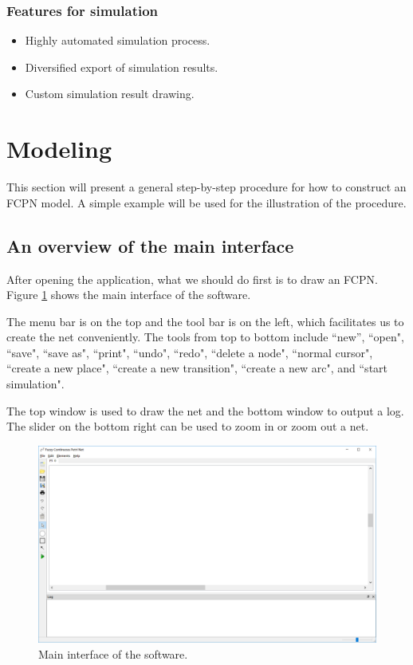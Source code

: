 \documentclass[journal,a4paper,onecolumn]{article}
\begin{document}
\subsubsection{Features for simulation}
\begin{itemize}
	\item Highly automated simulation process.
	\item Diversified export of simulation results.
	\item Custom simulation result drawing.
\end{itemize}






\clearpage
\section{Modeling}

This section will present a general step-by-step procedure for how to construct an FCPN model. A simple example will be used for the illustration of the procedure.

\subsection{An overview of the main interface}
After opening the application, what we should do first is to draw an FCPN. Figure \ref{fig:Maininterface} shows the main interface of the software. 

The menu bar is on the top and the tool bar is on the left, which facilitates us to create the net conveniently. The tools from top to bottom include ``new'', ``open", ``save", ``save as", ``print", ``undo", ``redo", ``delete a node", ``normal cursor", ``create a new place", ``create a new transition", ``create a new arc", and ``start simulation". 

The top window is used to draw the net and the bottom window to output a log. The slider on the bottom right can be used to zoom in or zoom out a net.

\begin{figure}[!hbt]
	\begin{center}
		\includegraphics[width=\columnwidth]{fig1}
		\caption{Main interface of the software.}
		\label{fig:Maininterface}
	\end{center}
\end{figure}
\end{document}
